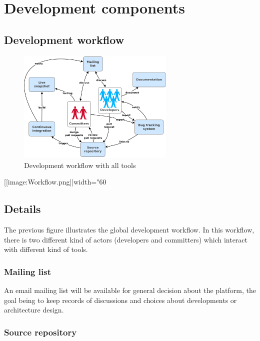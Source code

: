 \chapter{Development components}
\label{ch:development-components}

\section{Development workflow}
\label{sec:development-workflow}


\begin{figure}
\centering
\includegraphics[width=0.67\textwidth]{images/development-workflow.png}
\caption{Development workflow with all tools}
\label{fig:development-worflow}
\end{figure}
[[image:Workflow.png||width="60%

\section{Details}
\label{sec:details}

The previous figure illustrates the global development workflow.  In this workflow, there is two different kind of actors (developers and committers) which interact with different kind of tools.

\subsection{Mailing list}
\label{sec:mailing-list}

An email mailing list will be available for general decision about the platform, the goal being to keep records of discussions and choices about developments or architecture design.

\subsection{Source repository}
\label{sec:source-repository}

